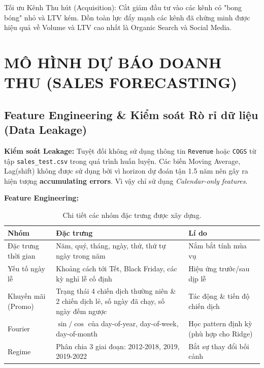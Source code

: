 \documentclass{article}
\begin{document}
Tối ưu Kênh Thu hút (Acquisition): Cắt giảm đầu tư vào các kênh có "bong bóng" nhỏ và LTV kém. Dồn toàn lực đẩy mạnh các kênh đã chứng minh được hiệu quả về Volume và LTV cao nhất là Organic Search và Social Media.













\section{MÔ HÌNH DỰ BÁO DOANH THU (SALES FORECASTING)}

\subsection{Feature Engineering \& Kiểm soát Rò rỉ dữ liệu (Data Leakage)}
\textbf{Kiểm soát Leakage:} Tuyệt đối không sử dụng thông tin \texttt{Revenue} hoặc \texttt{COGS} từ tập \texttt{sales\_test.csv} trong quá trình huấn luyện. Các biến Moving Average, Lag(shift) không được sử dụng bởi vì horizon dự đoán tận 1.5 năm nên gây ra hiện tượng \textbf{accumulating errors}. Vì vậy chỉ sử dụng \textit{Calendar-only features}.

\textbf{Feature Engineering:}

\begin{table}[htbp]
\centering
\caption{Chi tiết các nhóm đặc trưng được xây dựng.}
\renewcommand{\arraystretch}{1.2} %
\begin{tabular}{@{} p{3.5cm} p{7cm} p{4.5cm} @{}}
\toprule
\textbf{Nhóm} & \textbf{Đặc trưng} & \textbf{Lí do} \\
\midrule
Đặc trưng thời gian & Năm, quý, tháng, ngày, thứ, thứ tự ngày trong năm & Nắm bắt tính mùa vụ \\
Yếu tố ngày lễ & Khoảng cách tới Tết, Black Friday, các kỳ nghỉ lễ cố định & Hiệu ứng trước/sau dịp lễ \\
Khuyến mãi (Promo) & Trạng thái 4 chiến dịch thường niên \& 2 chiến dịch lẻ, số ngày đã chạy, số ngày đếm ngược & Tác động \& tiến độ chiến dịch \\
Fourier & $\sin / \cos$ của day-of-year, day-of-week, day-of-month & Học pattern định kỳ (phù hợp cho Ridge) \\
Regime & Phân chia 3 giai đoạn: 2012-2018, 2019, 2019-2022 & Bắt sự thay đổi bối cảnh \\
\bottomrule
\end{tabular}
\end{table}
\end{document}
